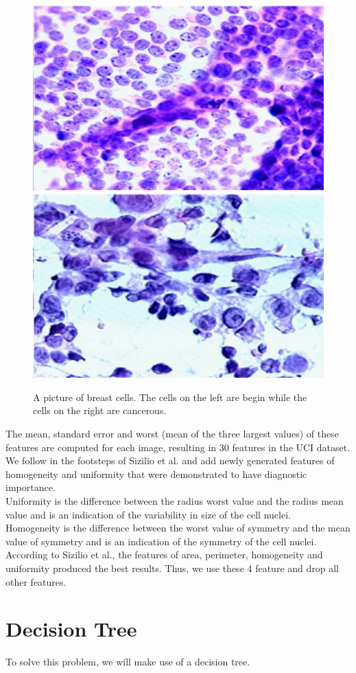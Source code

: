 \begin{figure}[h!]
	\centering
	\includegraphics[width=0.4\linewidth]{screenshot001}
	\hspace{0.5cm}
	\includegraphics[width=0.4\linewidth]{screenshot002}
	\caption{A picture of breast cells. The cells on the left are begin while the cells on the right are cancerous.}
	\label{fig:images}
\end{figure}

\newpage

The mean, standard error and worst (mean of the three largest values) of these features are computed for each image, resulting in 30 features in the UCI dataset. \\

We follow in the footsteps of Sizilio et al. and add newly generated features of homogeneity and uniformity that were demonstrated to have diagnostic importance. \\

Uniformity is the difference between the radius worst value and the radius mean value and is an indication of the variability in size of the cell nuclei. \\

Homogeneity is the difference between the worst value of symmetry and the mean value of symmetry and is an indication of the symmetry of the cell nuclei. \\

According to Sizilio et al., the features of area, perimeter, homogeneity and uniformity produced the best results. Thus, we use these 4 feature and drop all other features. \\

\section{Decision Tree}
To solve this problem, we will make use of a decision tree. \\

